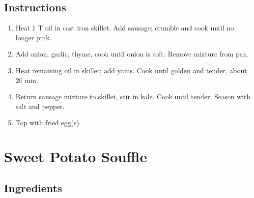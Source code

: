 \documentclass[ansiapaper,10pt,english]{sphinxmanual}
\begin{document}
\section{Instructions}
\label{\detokenize{SPH:instructions}}\begin{enumerate}
\item {} 
Heat 1 T oil in cast iron skillet. Add sausage; crumble and cook until no longer pink.

\item {} 
Add onion, garlic, thyme, cook until onion is soft. Remove mixture from pan.

\item {} 
Heat remaining oil in skillet; add yams.  Cook until golden and tender, about 20 min.

\item {} 
Return sausage mixture to skillet, stir in kale. Cook until tender. Season with salt and pepper.

\item {} 
Top with fried egg(s).

\end{enumerate}


\chapter{Sweet Potato Souffle}
\label{\detokenize{Sweet_PS:sweet-potato-souffle}}\label{\detokenize{Sweet_PS::doc}}

\section{Ingredients}
\label{\detokenize{Sweet_PS:ingredients}}
%
\begin{sphinxVerbatim}[commandchars=\\\{\}]
     

  

 

   

  

   

   

   
\end{sphinxVerbatim}
\end{document}
